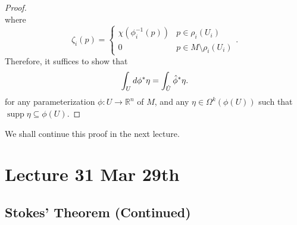 \documentclass[notoc,notitlepage]{tufte-book}
\DeclareMathOperator{\supp}{supp}
\begin{document}
\begin{proof}
{\begin{equation*}
  \end{equation*}
  where
  \begin{equation*}
    \zeta_i(p) = \begin{cases}
      \chi(\phi_i^{-1}(p)) & p \in \rho_i(U_i) \\
      0          & p \in M \setminus \rho_i(U_i)
    \end{cases}.
  \end{equation*}}
  Therefore, it suffices to show that
  \begin{equation}\label{eq:goal_for_stokes}
    \int_{U} \mathop{}\!d{\phi^* \eta} = \int_{\hat{U}} \hat{\phi}^* \eta.
  \end{equation}
  for any parameterization $\phi : U \to \mathbb{R}^n$ of $M$, and any $\eta \in
  \Omega^k(\phi(U))$ such that $\supp \eta \subseteq \phi(U)$.

\end{proof}

We shall continue this proof in the next lecture.



\chapter{Lecture 31 Mar 29th}%
\label{chp:lecture_31_mar_29th}

\section{Stokes' Theorem (Continued)}%
\label{sec:stokes_theorem_continued}
\end{document}
